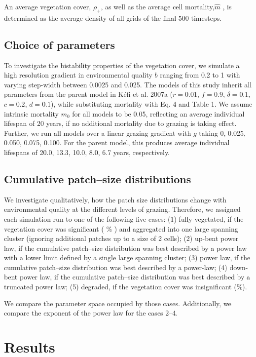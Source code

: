 An average vegetation cover, $\rho_+$, as well as the average cell mortality,$\hat{m}$ , is determined as the average density of all grids of the final 500 timesteps.


\subsection{Choice of parameters}

To investigate the bistability properties of the vegetation cover, we simulate a high resolution gradient in environmental quality $b$ ranging from 0.2 to 1 with varying step-width between 0.0025 and 0.025. The models of this study inherit all parameters from the parent model in K\'efi et al. 2007a ($r = 0.01$, $f = 0.9$, $\delta = 0.1$, $c = 0.2$, $d = 0.1$), while substituting mortality with Eq. 4 and Table 1. We assume intrinsic mortality $m_0$ for all models to be 0.05, reflecting an average individual lifespan of 20 years, if no additional mortality due to grazing is taking effect.  
Further, we run all models over a linear grazing gradient with $g$ taking 0, 0.025, 0.050, 0.075, 0.100.
For the parent model, this produces average individual lifespans of 20.0, 13.3, 10.0, 8.0, 6.7 years, respectively. 

\subsection{Cumulative patch--size distributions}
We investigate qualitatively, how the patch size distributions change with environmental quality at the different levels of grazing. Therefore, we assigned each simulation run to one of the following five cases: (1) fully vegetated, if the vegetation cover was significant ( \% ) and aggregated into one large spanning cluster (ignoring additional patches up to a size of 2 cells); (2) up-bent power law, if the cumulative patch--size distribution was best described by a power law with a lower limit defined by a single large spanning cluster; (3) power law, if the cumulative patch--size distribution  was best described by a power-law; (4) down-bent power law, if the cumulative patch--size distribution was best described by a truncated power law; (5) degraded, if the vegetation cover was insignificant (\%).

We compare the parameter space occupied by those cases. Additionally, we compare the exponent of the power law for the cases 2--4. 

\section{Results}

